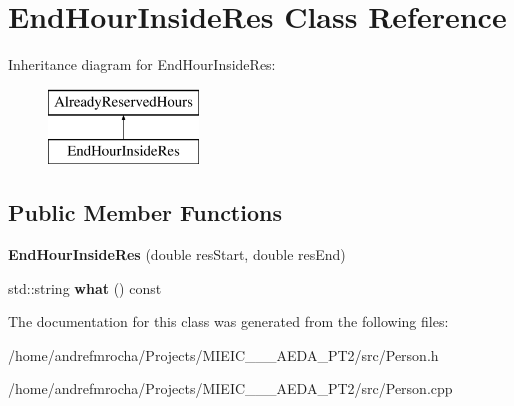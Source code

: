 \hypertarget{class_end_hour_inside_res}{}\section{End\+Hour\+Inside\+Res Class Reference}
\label{class_end_hour_inside_res}
Inheritance diagram for End\+Hour\+Inside\+Res\+:\begin{figure}[H]
\begin{center}
\leavevmode
\includegraphics[height=2.000000cm]{class_end_hour_inside_res}
\end{center}
\end{figure}
\subsection*{Public Member Functions}
\begin{DoxyCompactItemize}
\item 
\mbox{\label{class_end_hour_inside_res_af2162a2e870bf25d64f773089def5ec2}} 
{\bfseries End\+Hour\+Inside\+Res} (double res\+Start, double res\+End)
\item 
\mbox{\label{class_end_hour_inside_res_afee9514b15c167847bc55ebe833076ff}} 
std\+::string {\bfseries what} () const
\end{DoxyCompactItemize}


The documentation for this class was generated from the following files\+:\begin{DoxyCompactItemize}
\item 
/home/andrefmrocha/\+Projects/\+M\+I\+E\+I\+C\+\_\+\_\+\_\+\+A\+E\+D\+A\+\_\+\+P\+T2/src/Person.\+h\item 
/home/andrefmrocha/\+Projects/\+M\+I\+E\+I\+C\+\_\+\_\+\_\+\+A\+E\+D\+A\+\_\+\+P\+T2/src/Person.\+cpp\end{DoxyCompactItemize}

